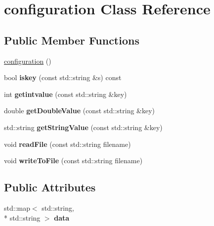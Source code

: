 \hypertarget{classconfiguration}{\section{configuration Class Reference}
\label{classconfiguration}
}
\subsection*{Public Member Functions}
\begin{DoxyCompactItemize}
\item 
\hyperlink{classconfiguration_ad4446282343ce7dd8a67ffbc15f1d575}{configuration} ()
\item 
\hypertarget{classconfiguration_a2cd390347727161f3663f04f39c13b7f}{bool {\bfseries iskey} (const std\-::string \&s) const }\label{classconfiguration_a2cd390347727161f3663f04f39c13b7f}

\item 
\hypertarget{classconfiguration_adcf1ed053ba6786dafe5e82b04635fd8}{int {\bfseries getintvalue} (const std\-::string \&key)}\label{classconfiguration_adcf1ed053ba6786dafe5e82b04635fd8}

\item 
\hypertarget{classconfiguration_a5aa70bcb9aff4526951b7b9b69ff7bf8}{double {\bfseries get\-Double\-Value} (const std\-::string \&key)}\label{classconfiguration_a5aa70bcb9aff4526951b7b9b69ff7bf8}

\item 
\hypertarget{classconfiguration_ab33d8f8158e394aec793b189a127d925}{std\-::string {\bfseries get\-String\-Value} (const std\-::string \&key)}\label{classconfiguration_ab33d8f8158e394aec793b189a127d925}

\item 
\hypertarget{classconfiguration_a7d48d243abca23456cf3e5c64945f84c}{void {\bfseries read\-File} (const std\-::string filename)}\label{classconfiguration_a7d48d243abca23456cf3e5c64945f84c}

\item 
\hypertarget{classconfiguration_ad1f54f601d26c7d3b6f2319a25b64eba}{void {\bfseries write\-To\-File} (const std\-::string filename)}\label{classconfiguration_ad1f54f601d26c7d3b6f2319a25b64eba}

\end{DoxyCompactItemize}
\subsection*{Public Attributes}
\begin{DoxyCompactItemize}
\item 
\hypertarget{classconfiguration_ac11a1c00053ce7721af0f909744f6085}{std\-::map$<$ std\-::string, \\*
std\-::string $>$ {\bfseries data}}\label{classconfiguration_ac11a1c00053ce7721af0f909744f6085}

\end{DoxyCompactItemize}


